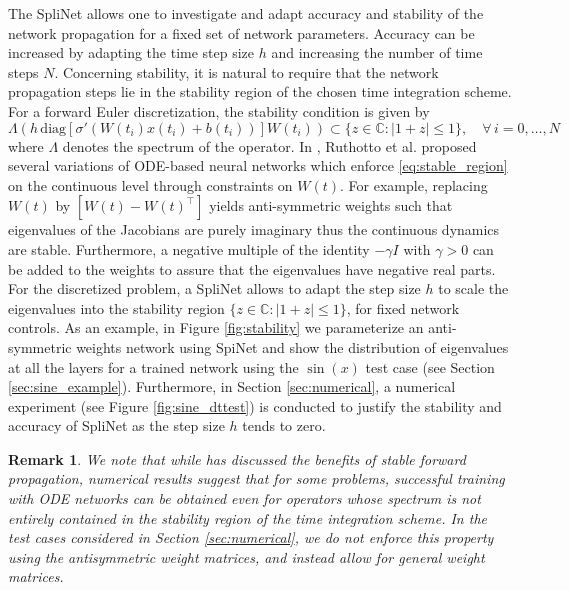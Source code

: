 \documentclass[12pt]{amsart}
\newtheorem{remark}{Remark}
\begin{document}
The SpliNet allows one to investigate and adapt accuracy and stability of the network propagation for a fixed set of network parameters.
Accuracy can be increased by adapting the time step size $h$ and increasing the number of time steps $N$.
Concerning stability, it is natural to require that the network propagation steps lie in the stability region of the chosen time integration scheme.
For a forward Euler discretization, the stability condition is given by
   \begin{equation}
   \label{eq:stable_region}
       \Lambda\left(h \,\text{diag}\left[\sigma'\left(W(t_i)x(t_i)+b(t_i)\right)\right]W(t_i)\right) \subset \{z\in\mathbb{C}:|1+z|\leq 1\}, \quad \forall \, i=0,\dots,N
   \end{equation}
  where $\Lambda$ denotes the spectrum of the operator.
   In \cite{haber2017stable}, Ruthotto et al. proposed several variations of ODE-based neural networks which enforce \eqref{eq:stable_region} on the continuous level through constraints on $W(t)$.
   For example, replacing $W(t)$ by $[W(t) - W(t)^\intercal]$ yields anti-symmetric weights such that eigenvalues of the Jacobians are purely imaginary thus the continuous dynamics are stable.
   Furthermore, a negative multiple of the identity $-\gamma I$ with $\gamma > 0$ can be added to the weights to assure that the eigenvalues have negative real parts.
   For the discretized problem, a SpliNet allows to adapt the step size $h$ to scale the eigenvalues into the stability region $\{z\in\mathbb{C}: |1+z| \leq 1\}$, for fixed network controls.
   As an example, in Figure \ref{fig:stability} we parameterize an anti-symmetric weights network using SpiNet and show the distribution of eigenvalues at all the layers for a trained network using the $\sin(x)$ test case (see Section \ref{sec:sine_example}).
   Furthermore, in Section \ref{sec:numerical}, a numerical experiment (see Figure \ref{fig:sine_dttest}) is conducted to justify the stability and accuracy of SpliNet as the step size $h$ tends to zero.

   \begin{remark}
    We note that while \cite{haber2017stable} has discussed the benefits of stable forward propagation, numerical results suggest that for some problems, successful training with ODE networks can be obtained even for operators whose spectrum is not entirely contained in the stability region of the time integration scheme.
    In the test cases considered in Section \ref{sec:numerical}, we do not enforce this property using the antisymmetric weight matrices, and instead allow for general weight matrices.
   \end{remark}
\end{document}
